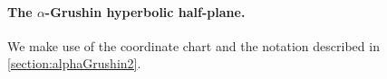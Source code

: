 \documentclass[11pt,twoside,a4paper]{article}
\newcommand{\red}{\color{red}}
\newcommand*\diff{\mathop{}\!\mathrm{d}}
\newcommand{\bbH}{\mathbb{H}}
\newcommand{\vol}{\mathrm{dvol}}
\newcommand{\Ric}{\mathrm{Ric}}
\newcommand{\m}{\mathfrak m} %
\newcommand{\hes}{\mathrm{Hess}}
\theoremstyle{theorem}
\newtheorem{prop}[theorem]{Proposition}
\theoremstyle{definition}
\theoremstyle{remark}
\theoremstyle{proof}
\begin{document}






\paragraph{The $\alpha$-Grushin hyperbolic half-plane.}


We make use of the coordinate chart and the notation described in \cref{section:alphaGrushin2}.

\end{document}
